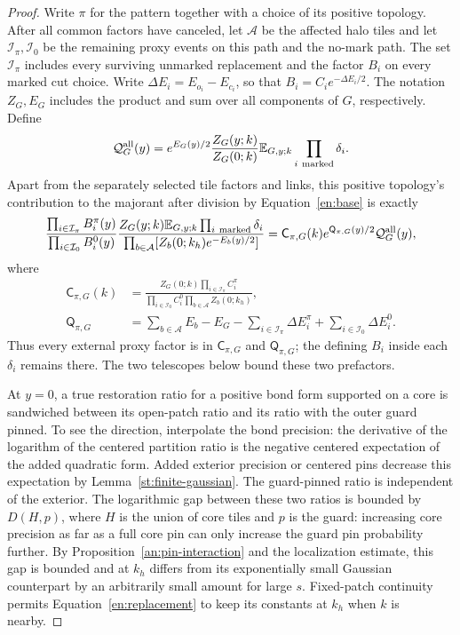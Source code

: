 \begin{proof}
Write $\pi$ for the pattern together with a choice of its positive
topology.  After all common factors have canceled, let $\mathcal A$
be the affected halo tiles and let $\mathcal I_\pi,\mathcal I_0$ be
the remaining proxy events on this path and the no-mark path.
The set $\mathcal I_\pi$ includes every surviving unmarked replacement
and the factor $B_i$ on every marked cut choice.  Write
$\Delta E_i=E_{o_i}-E_{c_i}$, so that
$B_i=C_i e^{-\Delta E_i/2}$.  The notation $Z_G,E_G$ includes the
product and sum over all components of $G$, respectively.  Define
\[
 \mathcal Q_G^{\rm all}(y)
 =e^{E_G(y)/2}\frac{Z_G(y;k)}{Z_G(0;k)}
                  \mathbb E_{G,y;k}\prod_{i\ {\rm marked}}\delta_i.
\]
Apart from the separately selected tile factors and links, this
positive topology's contribution to the majorant after division by
Equation~\eqref{en:base} is exactly
\[
 \frac{\prod_{i\in\mathcal I_\pi}B_i^\pi(y)}
      {\prod_{i\in\mathcal I_0}B_i^0(y)}
 \frac{Z_G(y;k)\mathbb E_{G,y;k}\prod_{i\ {\rm marked}}\delta_i}
      {\prod_{b\in\mathcal A}[Z_b(0;k_h)e^{-E_b(y)/2}]}
 =\mathsf C_{\pi,G}(k)e^{\mathsf Q_{\pi,G}(y)/2}
       \mathcal Q_G^{\rm all}(y),
\]
where
\[
 \begin{split}
 \mathsf C_{\pi,G}(k)
 &=\frac{Z_G(0;k)\prod_{i\in\mathcal I_\pi}C_i^\pi}
         {\prod_{i\in\mathcal I_0}C_i^0
          \prod_{b\in\mathcal A}Z_b(0;k_h)},\\
 \mathsf Q_{\pi,G}
 &=\sum_{b\in\mathcal A}E_b-E_G
   -\sum_{i\in\mathcal I_\pi}\Delta E_i^\pi
   +\sum_{i\in\mathcal I_0}\Delta E_i^0.
 \end{split}
\]
Thus every external proxy factor is in $\mathsf C_{\pi,G}$ and
$\mathsf Q_{\pi,G}$; the defining $B_i$ inside each $\delta_i$
remains there.  The two telescopes below bound these two prefactors.

At $y=0$, a true restoration ratio for a positive bond form supported
on a core is sandwiched between its open-patch ratio and its ratio with
the outer guard pinned.  To see the direction, interpolate the bond
precision: the derivative of the logarithm of the centered partition
ratio is the negative centered expectation of the added quadratic
form.  Added exterior precision or centered pins decrease this
expectation by Lemma~\ref{st:finite-gaussian}.  The guard-pinned ratio is
independent of the exterior.  The logarithmic gap between these two
ratios is bounded by $D(H,p)$, where $H$ is the union of core tiles
and $p$ is the guard: increasing core precision as far as a full core
pin can only increase the guard pin probability further.  By
Proposition~\ref{an:pin-interaction} and the localization estimate, this
gap is bounded and at $k_h$ differs from its exponentially small
Gaussian counterpart by an arbitrarily small amount for large $s$.
Fixed-patch continuity permits Equation~\eqref{en:replacement} to
keep its constants at $k_h$ when $k$ is nearby.


\end{proof}
